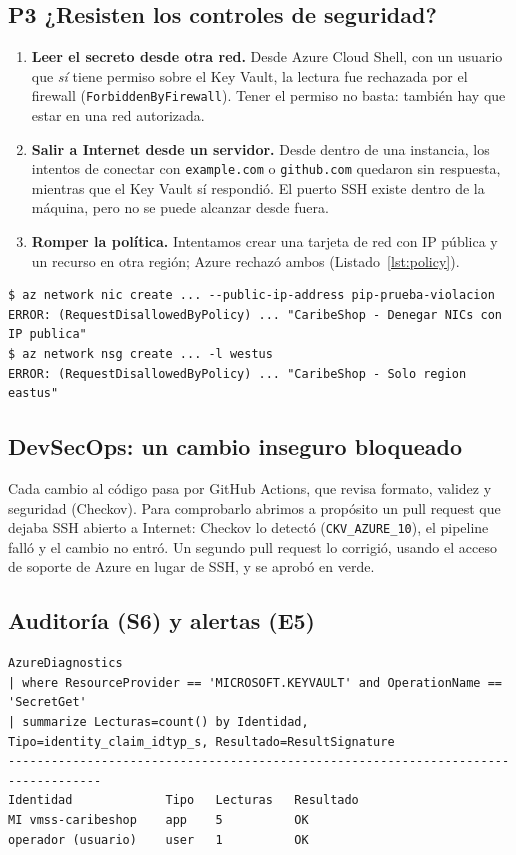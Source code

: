 \subsection{P3 ¿Resisten los controles de seguridad?}
\begin{enumerate}
  \item \textbf{Leer el secreto desde otra red.} Desde Azure Cloud Shell, con un usuario que
        \emph{sí} tiene permiso sobre el Key Vault, la lectura fue rechazada por el firewall
        (\texttt{ForbiddenByFirewall}). Tener el permiso no basta: también hay que estar en una
        red autorizada.
  \item \textbf{Salir a Internet desde un servidor.} Desde dentro de una instancia, los intentos de
        conectar con \texttt{example.com} o \texttt{github.com} quedaron sin respuesta, mientras
        que el Key Vault sí respondió. El puerto SSH existe dentro de la máquina, pero no se puede
        alcanzar desde fuera.
  \item \textbf{Romper la política.} Intentamos crear una tarjeta de red con IP pública y un recurso
        en otra región; Azure rechazó ambos (Listado~\ref{lst:policy}).
\end{enumerate}

\begin{lstlisting}[caption={P3.3: Azure Policy rechaza los recursos prohibidos (salida abreviada).},label={lst:policy},language={}]
$ az network nic create ... --public-ip-address pip-prueba-violacion
ERROR: (RequestDisallowedByPolicy) ... "CaribeShop - Denegar NICs con IP publica"
$ az network nsg create ... -l westus
ERROR: (RequestDisallowedByPolicy) ... "CaribeShop - Solo region eastus"
\end{lstlisting}

\subsection{DevSecOps: un cambio inseguro bloqueado}
Cada cambio al código pasa por GitHub Actions, que revisa formato, validez y seguridad (Checkov).
Para comprobarlo abrimos a propósito un pull request que dejaba SSH abierto a Internet: Checkov lo
detectó (\texttt{CKV\_AZURE\_10}), el pipeline falló y el cambio no entró. Un segundo pull request
lo corrigió, usando el acceso de soporte de Azure en lugar de SSH, y se aprobó en verde.

\subsection{Auditoría (S6) y alertas (E5)}
\begin{lstlisting}[caption={S6: consulta KQL de lecturas del secreto y resultado.},label={lst:kql},language={}]
AzureDiagnostics
| where ResourceProvider == 'MICROSOFT.KEYVAULT' and OperationName == 'SecretGet'
| summarize Lecturas=count() by Identidad, Tipo=identity_claim_idtyp_s, Resultado=ResultSignature
-----------------------------------------------------------------------------------
Identidad             Tipo   Lecturas   Resultado
MI vmss-caribeshop    app    5          OK
operador (usuario)    user   1          OK
\end{lstlisting}

